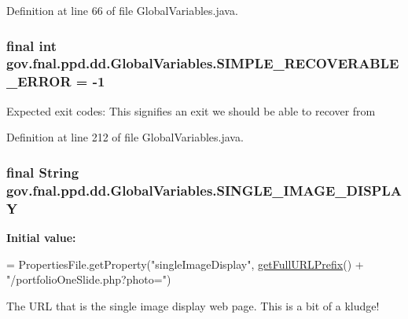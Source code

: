 Definition at line 66 of file Global\-Variables.\-java.

\hypertarget{classgov_1_1fnal_1_1ppd_1_1dd_1_1GlobalVariables_aa1eece63cce68ac0186379fc2fa2272a}{
\subsubsection[{S\-I\-M\-P\-L\-E\-\_\-\-R\-E\-C\-O\-V\-E\-R\-A\-B\-L\-E\-\_\-\-E\-R\-R\-O\-R}]{\setlength{\rightskip}{0pt plus 5cm}final int gov.\-fnal.\-ppd.\-dd.\-Global\-Variables.\-S\-I\-M\-P\-L\-E\-\_\-\-R\-E\-C\-O\-V\-E\-R\-A\-B\-L\-E\-\_\-\-E\-R\-R\-O\-R = -\/1\hspace{0.3cm}{\ttfamily [static]}}}\label{classgov_1_1fnal_1_1ppd_1_1dd_1_1GlobalVariables_aa1eece63cce68ac0186379fc2fa2272a}
Expected exit codes\-: This signifies an exit we should be able to recover from 

Definition at line 212 of file Global\-Variables.\-java.

\hypertarget{classgov_1_1fnal_1_1ppd_1_1dd_1_1GlobalVariables_ab018dd06fadda0d1bc99e7de66894e84}{
\subsubsection[{S\-I\-N\-G\-L\-E\-\_\-\-I\-M\-A\-G\-E\-\_\-\-D\-I\-S\-P\-L\-A\-Y}]{\setlength{\rightskip}{0pt plus 5cm}final String gov.\-fnal.\-ppd.\-dd.\-Global\-Variables.\-S\-I\-N\-G\-L\-E\-\_\-\-I\-M\-A\-G\-E\-\_\-\-D\-I\-S\-P\-L\-A\-Y\hspace{0.3cm}{\ttfamily [static]}}}\label{classgov_1_1fnal_1_1ppd_1_1dd_1_1GlobalVariables_ab018dd06fadda0d1bc99e7de66894e84}
{\bfseries Initial value\-:}
\begin{DoxyCode}
= PropertiesFile.getProperty(\textcolor{stringliteral}{"singleImageDisplay"},
            \hyperlink{classgov_1_1fnal_1_1ppd_1_1dd_1_1GlobalVariables_ab7639ebfcc296b374593079a06026c65}{getFullURLPrefix}() + \textcolor{stringliteral}{"/portfolioOneSlide.php?photo="})
\end{DoxyCode}
The U\-R\-L that is the single image display web page. This is a bit of a kludge! 

